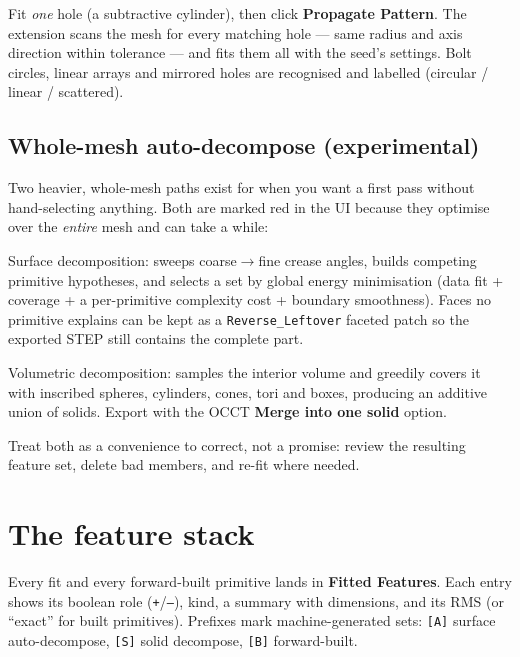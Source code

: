 \documentclass[11pt,a4paper]{article}
\newcommand{\ui}[1]{\textsf{\textbf{#1}}}   %
\begin{document}
Fit \emph{one} hole (a subtractive cylinder), then click
\ui{Propagate Pattern}. The extension scans the mesh for every matching hole
--- same radius and axis direction within tolerance --- and fits them all with
the seed's settings. Bolt circles, linear arrays and mirrored holes are
recognised and labelled (circular / linear / scattered).

\subsection{Whole-mesh auto-decompose (experimental)}

Two heavier, whole-mesh paths exist for when you want a first pass without
hand-selecting anything. Both are marked red in the UI because they optimise
over the \emph{entire} mesh and can take a while:

\begin{description}[style=nextline]
  \item[Auto-Decompose Whole Mesh] Surface decomposition: sweeps
    coarse$\to$fine crease angles, builds competing primitive hypotheses, and
    selects a set by global energy minimisation (data fit + coverage +
    a per-primitive complexity cost + boundary smoothness). Faces no
    primitive explains can be kept as a \texttt{Reverse\_Leftover} faceted
    patch so the exported STEP still contains the complete part.
  \item[Auto-Decompose Solid (Boolean)] Volumetric decomposition: samples the
    interior volume and greedily covers it with inscribed spheres, cylinders,
    cones, tori and boxes, producing an additive union of solids. Export with
    the OCCT \ui{Merge into one solid} option.
\end{description}

Treat both as a convenience to correct, not a promise: review the resulting
feature set, delete bad members, and re-fit where needed.

\section{The feature stack}
\label{sec:stack}

Every fit and every forward-built primitive lands in \ui{Fitted Features}.
Each entry shows its boolean role (\texttt{+}/\texttt{--}), kind, a summary
with dimensions, and its RMS (or ``exact'' for built primitives). Prefixes mark
machine-generated sets: \texttt{[A]} surface auto-decompose, \texttt{[S]}
solid decompose, \texttt{[B]} forward-built.
\end{document}
